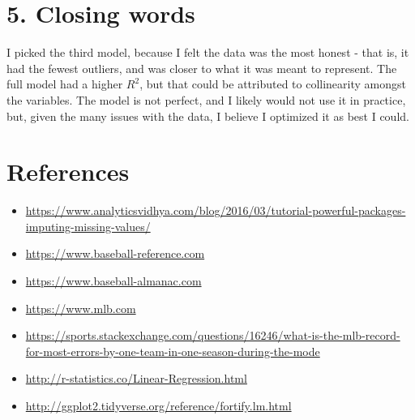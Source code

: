 \documentclass[]{article}
\providecommand{\tightlist}{%
  \setlength{\itemsep}{0pt}\setlength{\parskip}{0pt}}
\begin{document}
\section{5. Closing words}\label{closing-words}

I picked the third model, because I felt the data was the most honest -
that is, it had the fewest outliers, and was closer to what it was meant
to represent. The full model had a higher \(R^2\), but that could be
attributed to collinearity amongst the variables. The model is not
perfect, and I likely would not use it in practice, but, given the many
issues with the data, I believe I optimized it as best I could.

\section{References}\label{references}

\begin{itemize}
\tightlist
\item
  \url{https://www.analyticsvidhya.com/blog/2016/03/tutorial-powerful-packages-imputing-missing-values/}
\item
  \url{https://www.baseball-reference.com}
\item
  \url{https://www.baseball-almanac.com}
\item
  \url{https://www.mlb.com}
\item
  \url{https://sports.stackexchange.com/questions/16246/what-is-the-mlb-record-for-most-errors-by-one-team-in-one-season-during-the-mode}
\item
  \url{http://r-statistics.co/Linear-Regression.html}
\item
  \url{http://ggplot2.tidyverse.org/reference/fortify.lm.html}
\end{itemize}
\end{document}
